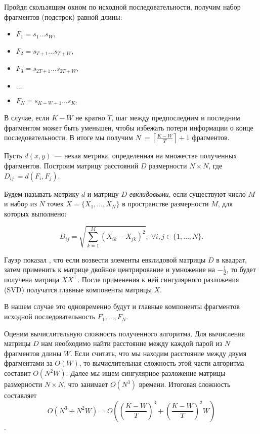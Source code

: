 Пройдя скользящим окном по исходной последовательности, получим набор фрагментов (подстрок) равной длины:

\begin{itemize}
  \item $F_1 = s_1\ldots s_W$,
  \item $F_2 = s_{T+1}\ldots s_{T+W}$,
  \item $F_3 = s_{2T+1}\ldots s_{2T + W}$,
  \item $\ldots$
  \item $F_N = s_{K-W+1}\ldots s_K$.
\end{itemize}

В случае, если $K-W$ не кратно $T$, шаг между предпоследним и последним фрагментом может быть уменьшен, чтобы избежать потери информации о конце последовательности. В итоге мы получим $N~= \left\lceil\frac{K-W}{T}\right\rceil + 1$ фрагментов.

Пусть $d(x,y)$~--- некая метрика, определенная на множестве полученных фрагментов. Построим матрицу расстояний $D$ размерности $N\times N$, где $D_{ij}~= d(F_i, F_j)$.

Будем называть метрику $d$ и матрицу $D$ \textit{евклидовыми}, если существуют число $M$ и набор из $N$ точек $X = \{X_1,\ldots,X_N\}$ в пространстве размерности $M$, для которых выполнено:

$$D_{ij} = \sqrt{\sum_{k=1}^M \left(X_{ik} - X_{jk}\right)^2}, \; \forall i, j \in \{1,\ldots, N\}.$$

Гауэр показал \cite{Gower1966}, что если возвести элементы евклидовой матрицы $D$ в квадрат, затем применить к матрице двойное центрирование и умножение на $-\frac{1}{2}$, то будет получена матрица $XX^\top$. После применения к ней сингулярного разложения (SVD) получатся главные компоненты матрицы $X$.

В нашем случае это одновременно будут и главные компоненты фрагментов исходной последовательность $F_1,\ldots,F_N$.

Оценим вычислительную сложность полученного алгоритма. Для вычисления матрицы $D$ нам необходимо найти расстояние между каждой парой из $N$ фрагментов длины $W$. Если считать, что мы находим расстояние между двумя фрагментами за $O(W)$, то вычислительная сложность этой части алгоритма составит $O(N^2W)$. Далее мы ищем сингулярное разложение матрицы размерности $N\times N$, что занимает $O(N^3)$ времени. Итоговая сложность составляет 
$$O(N^3 + N^2W) = O\left(\left(\frac{K-W}{T}\right)^3 + \left(\frac{K-W}{T}\right)^2W\right)$$.

